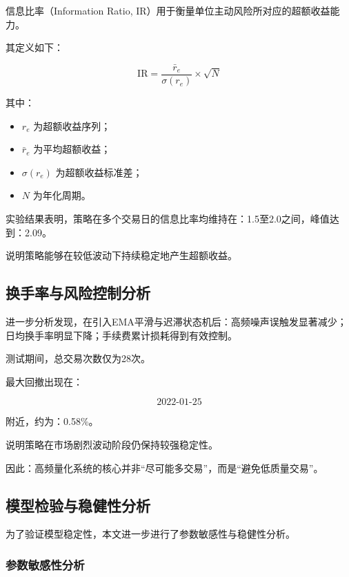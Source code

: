 \documentclass[withoutpreface,bwprint]{cumcmthesis}
\begin{document}
信息比率（Information Ratio, IR）用于衡量单位主动风险所对应的超额收益能力。

其定义如下：

\begin{equation}
    \text{IR} = \frac{\bar{r}_e}{\sigma(r_e)} \times \sqrt{N}
    \label{eq:ir}
\end{equation}

其中：

\begin{itemize}
    \item $r_e$ 为超额收益序列；
    \item $\bar{r}_e$ 为平均超额收益；
    \item $\sigma(r_e)$ 为超额收益标准差；
    \item $N$ 为年化周期。
\end{itemize}

实验结果表明，策略在多个交易日的信息比率均维持在：1.5至2.0之间，峰值达到：2.09。

说明策略能够在较低波动下持续稳定地产生超额收益。

\subsection{换手率与风险控制分析}

进一步分析发现，在引入EMA平滑与迟滞状态机后：高频噪声误触发显著减少；日均换手率明显下降；手续费累计损耗得到有效控制。

测试期间，总交易次数仅为28次。

最大回撤出现在：

\begin{equation}
2022\text{-}01\text{-}25
\end{equation}

附近，约为：0.58\%。

说明策略在市场剧烈波动阶段仍保持较强稳定性。

因此：高频量化系统的核心并非“尽可能多交易”，而是“避免低质量交易”。

\subsection{模型检验与稳健性分析}

为了验证模型稳定性，本文进一步进行了参数敏感性与稳健性分析。

\subsubsection{参数敏感性分析}
\end{document}

